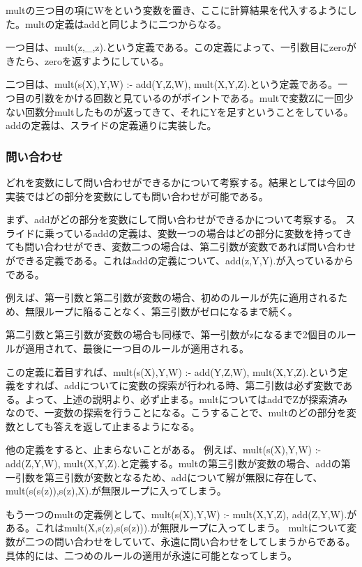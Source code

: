 \documentclass[uplatex,12pt]{jsarticle}
\begin{document}
multの三つ目の項にWをという変数を置き、ここに計算結果を代入するようにした。multの定義はaddと同じように二つからなる。

一つ目は、mult(z,_,z).という定義である。この定義によって、一引数目にzeroがきたら、zeroを返すようにしている。

二つ目は、mult(s(X),Y,W) :- add(Y,Z,W), mult(X,Y,Z).という定義である。一つ目の引数をかける回数と見ているのがポイントである。multで変数Zに一回少ない回数分multしたものが返ってきて、それにYを足すということをしている。
addの定義は、スライドの定義通りに実装した。

\subsubsection{問い合わせ}
どれを変数にして問い合わせができるかについて考察する。結果としては今回の実装ではどの部分を変数にしても問い合わせが可能である。

まず、addがどの部分を変数にして問い合わせができるかについて考察する。
スライドに乗っているaddの定義は、変数一つの場合はどの部分に変数を持ってきても問い合わせができ、変数二つの場合は、第二引数が変数であれば問い合わせができる定義である。これはaddの定義について、add(z,Y,Y).が入っているからである。

例えば、第一引数と第二引数が変数の場合、初めのルールが先に適用されるため、無限ループに陥ることなく、第三引数がゼロになるまで続く。

第二引数と第三引数が変数の場合も同様で、第一引数がzになるまで2個目のルールが適用されて、最後に一つ目のルールが適用される。

\vspace{12pt}

この定義に着目すれば、mult(s(X),Y,W) :- add(Y,Z,W), mult(X,Y,Z).という定義をすれば、addについてに変数の探索が行われる時、第二引数は必ず変数である。よって、上述の説明より、必ず止まる。multについてはaddでZが探索済みなので、一変数の探索を行うことになる。こうすることで、multのどの部分を変数としても答えを返して止まるようになる。

\vspace{12pt}

他の定義をすると、止まらないことがある。
例えば、mult(s(X),Y,W) :- add(Z,Y,W), mult(X,Y,Z).と定義する。multの第三引数が変数の場合、addの第一引数を第三引数が変数となるため、addについて解が無限に存在して、mult(s(s(z)),s(z),X).が無限ループに入ってしまう。

もう一つのmultの定義例として、mult(s(X),Y,W) :- mult(X,Y,Z), add(Z,Y,W).がある。これはmult(X,s(z),s(s(z))).が無限ループに入ってしまう。
multについて変数が二つの問い合わせをしていて、永遠に問い合わせをしてしまうからである。具体的には、二つめのルールの適用が永遠に可能となってしまう。
\end{document}
